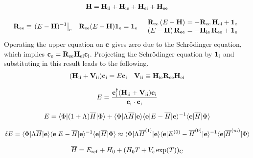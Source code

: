 \documentclass[11pt]{article}
\numberwithin{equation}{section}
\begin{document}
\begin{align}
  \mathbf{H}
=
  \mathbf{H}_{\mathrm{ii}}
+
  \mathbf{H}_{\mathrm{ie}}
+
  \mathbf{H}_{\mathrm{ei}}
+
  \mathbf{H}_{\mathrm{ee}}
\end{align}

\begin{align}
  \bo{R}_\mr{ee}
\equiv
\left.
  (
    E
  -
    \bo{H}
  )^{-1}
\right|_\mr{e}
&&
  \bo{R}_\mr{ee}
  (
    E
  -
    \bo{H}
  )
  \bo{1}_\mr{e}
=
  \bo{1}_\mr{e}
&&
\begin{array}{r@{\ }l}
  \bo{R}_\mr{ee}\,
  (
    E
  -
    \bo{H}
  )
&=
-
  \bo{R}_\mr{ee}\,
  \bo{H}_\mr{ei}
+
  \bo{1}_\mr{e}
\\
  (
    E
  -
    \bo{H}
  )\,
  \bo{R}_\mr{ee}
&=
-
  \bo{H}_\mr{ie}\,
  \bo{R}_\mr{ee}
+
  \bo{1}_\mr{e}
\end{array}
\end{align}
Operating the upper equation on $\mathbf{c}$ gives zero due to the Schr\"odinger equation, which implies
$
  \mathbf{c}_{\mathrm{e}}
=
  \mathbf{R}_{\mathrm{ee}}
  \mathbf{H}_{\mathrm{ei}}
  \mathbf{c}_{\mathrm{i}}
$.
Projecting the Schr\"odinger equation by $\mathbf{1}_{\mathrm{i}}$ and substituting in this result leads to the following.
\begin{align}
  (
    \mathbf{H}_{\mathrm{ii}}
  +
    \mathbf{V}_{\mathrm{ii}}
  )
  \mathbf{c}_{\mathrm{i}}
=
  E
  \mathbf{c}_{\mathrm{i}}
&&
  \mathbf{V}_{\mathrm{ii}}
\equiv
  \mathbf{H}_{\mathrm{ie}}
  \mathbf{R}_{\mathrm{ee}}
  \mathbf{H}_{\mathrm{ei}}
\end{align}

\begin{align}
  E
=
  \frac {
    \mathbf{c}_{\mathrm{i}}^\dagger
    (
      \mathbf{H}_{\mathrm{ii}}
    +
      \mathbf{V}_{\mathrm{ii}}
    )
    \mathbf{c}_{\mathrm{i}}
  }{
    \mathbf{c}_{\mathrm{i}}\cdot
    \mathbf{c}_{\mathrm{i}}
  }
\end{align}


\begin{align*}
  E
=
  \langle\Phi |
  (
    1
  +
    \Lambda 
  )
  \overline{H}
  |\Phi \rangle
+
  \langle\Phi |\Lambda \overline{H}|\mathbf{e}\rangle
  \langle\mathbf{e}|E - \overline{H}|\mathbf{e}\rangle^{-1}
  \langle\mathbf{e}|\overline{H}|\Phi \rangle
\end{align*}

\begin{align*}
  \delta  E
=
  \langle\Phi |\Lambda \overline{H}|\mathbf{e}\rangle
  \langle\mathbf{e}|E - \overline{H}|\mathbf{e}\rangle^{-1}
  \langle\mathbf{e}|\overline{H}|\Phi \rangle
\approx
  \langle\Phi |\Lambda \overline{H}^{(1)}|\mathbf{e}\rangle
  \langle\mathbf{e}|E^{(0)} - \overline{H}^{(0)}|\mathbf{e}\rangle^{-1}
  \langle\mathbf{e}|\overline{H}^{(m)}|\Phi \rangle
\end{align*}


\begin{align}
  \overline{H}
=
  E_{\mathrm{ref}}
+
  H_0
+
  (
    H_0
    T
  +
    V_{\mathrm{c}}\,
    \mathrm{exp}(T)
  )_{\mathrm{C}}
\end{align}
\end{document}
